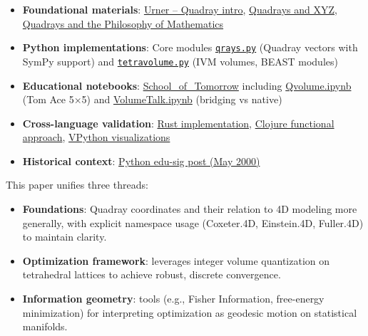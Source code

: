 \documentclass[
  10pt,
]{article}
\providecommand{\tightlist}{%
  \setlength{\itemsep}{0pt}\setlength{\parskip}{0pt}}
\begin{document}
\begin{itemize}
\tightlist
\item
  \textbf{Foundational materials}:
  \href{https://www.grunch.net/synergetics/quadintro.html}{Urner --
  Quadray intro},
  \href{https://www.grunch.net/synergetics/quadxyz.html}{Quadrays and
  XYZ}, \href{https://www.grunch.net/synergetics/quadphil.html}{Quadrays
  and the Philosophy of Mathematics}
\item
  \textbf{Python implementations}: Core modules
  \href{https://github.com/4dsolutions/m4w/blob/main/qrays.py}{\texttt{qrays.py}}
  (Quadray vectors with SymPy support) and
  \href{https://github.com/4dsolutions/m4w/blob/main/tetravolume.py}{\texttt{tetravolume.py}}
  (IVM volumes, BEAST modules)
\item
  \textbf{Educational notebooks}:
  \href{https://github.com/4dsolutions/School_of_Tomorrow}{School\_of\_Tomorrow}
  including
  \href{https://github.com/4dsolutions/School_of_Tomorrow/blob/master/Qvolume.ipynb}{Qvolume.ipynb}
  (Tom Ace 5×5) and
  \href{https://github.com/4dsolutions/School_of_Tomorrow/blob/master/VolumeTalk.ipynb}{VolumeTalk.ipynb}
  (bridging vs native)
\item
  \textbf{Cross-language validation}:
  \href{https://github.com/4dsolutions/rusty_rays}{Rust implementation},
  \href{https://github.com/4dsolutions/synmods}{Clojure functional
  approach}, \href{https://github.com/4dsolutions/BookCovers}{VPython
  visualizations}
\item
  \textbf{Historical context}:
  \href{https://mail.python.org/pipermail/edu-sig/2000-May/000498.html}{Python
  edu-sig post (May 2000)}
\end{itemize}

This paper unifies three threads:

\begin{itemize}
\tightlist
\item
  \textbf{Foundations}: Quadray coordinates and their relation to 4D
  modeling more generally, with explicit namespace usage (Coxeter.4D,
  Einstein.4D, Fuller.4D) to maintain clarity.
\item
  \textbf{Optimization framework}: leverages integer volume quantization
  on tetrahedral lattices to achieve robust, discrete convergence.
\item
  \textbf{Information geometry}: tools (e.g., Fisher Information,
  free-energy minimization) for interpreting optimization as geodesic
  motion on statistical manifolds.
\end{itemize}
\end{document}
